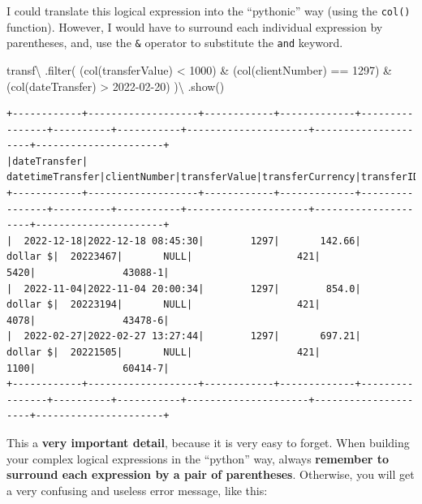 \documentclass[
  11pt,
  letterpaper,
  DIV=11,
  numbers=noendperiod]{scrreprt}
\newenvironment{Shaded}{\begin{snugshade}}{\end{snugshade}}
\newcommand{\BuiltInTok}[1]{\textcolor[rgb]{0.00,0.23,0.31}{#1}}
\newcommand{\DecValTok}[1]{\textcolor[rgb]{0.68,0.00,0.00}{#1}}
\newcommand{\NormalTok}[1]{\textcolor[rgb]{0.00,0.23,0.31}{#1}}
\newcommand{\OperatorTok}[1]{\textcolor[rgb]{0.37,0.37,0.37}{#1}}
\newcommand{\StringTok}[1]{\textcolor[rgb]{0.13,0.47,0.30}{#1}}
\begin{document}
I could translate this logical expression into the ``pythonic'' way
(using the \texttt{col()} function). However, I would have to surround
each individual expression by parentheses, and, use the \texttt{\&}
operator to substitute the \texttt{and} keyword.

\begin{Shaded}
\begin{Highlighting}[]
\NormalTok{transf}\OperatorTok{\textbackslash{}}
\NormalTok{  .}\BuiltInTok{filter}\NormalTok{(}
\NormalTok{    (col(}\StringTok{\textquotesingle{}transferValue\textquotesingle{}}\NormalTok{) }\OperatorTok{\textless{}} \DecValTok{1000}\NormalTok{) }\OperatorTok{\&}
\NormalTok{    (col(}\StringTok{\textquotesingle{}clientNumber\textquotesingle{}}\NormalTok{) }\OperatorTok{==} \DecValTok{1297}\NormalTok{) }\OperatorTok{\&}
\NormalTok{    (col(}\StringTok{\textquotesingle{}dateTransfer\textquotesingle{}}\NormalTok{) }\OperatorTok{\textgreater{}} \StringTok{\textquotesingle{}2022{-}02{-}20\textquotesingle{}}\NormalTok{)}
\NormalTok{  )}\OperatorTok{\textbackslash{}}
\NormalTok{  .show()}
\end{Highlighting}
\end{Shaded}

\begin{verbatim}
+------------+-------------------+------------+-------------+----------------+----------+-----------+---------------------+---------------------+----------------------+
|dateTransfer|   datetimeTransfer|clientNumber|transferValue|transferCurrency|transferID|transferLog|destinationBankNumber|destinationBankBranch|destinationBankAccount|
+------------+-------------------+------------+-------------+----------------+----------+-----------+---------------------+---------------------+----------------------+
|  2022-12-18|2022-12-18 08:45:30|        1297|       142.66|        dollar $|  20223467|       NULL|                  421|                 5420|               43088-1|
|  2022-11-04|2022-11-04 20:00:34|        1297|        854.0|        dollar $|  20223194|       NULL|                  421|                 4078|               43478-6|
|  2022-02-27|2022-02-27 13:27:44|        1297|       697.21|        dollar $|  20221505|       NULL|                  421|                 1100|               60414-7|
+------------+-------------------+------------+-------------+----------------+----------+-----------+---------------------+---------------------+----------------------+
\end{verbatim}

This a \textbf{very important detail}, because it is very easy to
forget. When building your complex logical expressions in the ``python''
way, always \textbf{remember to surround each expression by a pair of
parentheses}. Otherwise, you will get a very confusing and useless error
message, like this:
\end{document}

